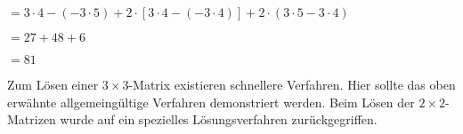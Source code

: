 \documentclass[11pt,a4paper]{article}
\begin{document}
$= 3\cdot4 - (-3\cdot5) + 2\cdot[3\cdot4 - (-3\cdot4)] + 2\cdot(3\cdot5-3\cdot4) $

$= 27 + 48 + 6$

$= 81$

Zum Lösen einer $3 \times 3$-Matrix existieren schnellere Verfahren. Hier sollte das oben erwähnte allgemeingültige Verfahren demonstriert werden. Beim Lösen der $2 \times 2$-Matrizen wurde auf ein spezielles Lösungsverfahren zurückgegriffen.
\end{document}
